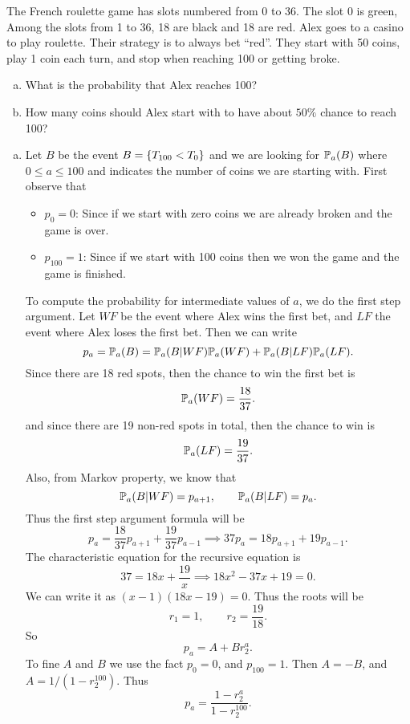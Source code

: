 \begin{problem}
	The French roulette game has slots numbered from 0 to 36. The slot 0 is green, Among the slots from 1 to 36, 18 are black and 18 are red. Alex goes to a casino to play roulette. Their strategy is to always bet ``red''. They start with 50 coins, play 1 coin each turn, and stop when reaching 100 or getting broke.
	\begin{enumerate}[(a)]
		\item What is the probability that Alex reaches 100?
		\item How many coins should Alex start with to have about $50\%$ chance to reach 100?
	\end{enumerate}
\end{problem}

\begin{solution}
	\begin{enumerate}[(a)]
		\item
			Let $B$ be the event $B = \{T_{100} < T_0\}$ and we are looking for $\mathbb{P}_a(B)$ where $0 \leq a \leq 100$ and indicates the number of coins we are starting with. First observe that
		\begin{itemize}
			\item $p_0 = 0$: Since if we start with zero coins we are already broken and the game is over.
			\item $p_{100} = 1$: Since if we start with 100 coins then we won the game and the game is finished.
		\end{itemize}
		To compute the probability for intermediate values of $a$, we do the first step argument. Let $WF$ be the event where Alex wins the first bet, and $LF$ the event where Alex loses the first bet. Then we can write
		\[ p_a = \mathbb{P}_a(B) = \mathbb{P}_a(B|WF)\mathbb{P}_a(WF) + \mathbb{P}_a(B|LF) \mathbb{P}_a(LF). \]
		Since there are 18 red spots, then the chance to win the first bet is
		\[ \mathbb{P}_a(WF) = \frac{18}{37}. \]
		and since there are 19 non-red spots in total, then the chance to win is
		\[ \mathbb{P}_a(LF)  = \frac{19}{37}.\]
		Also, from Markov property, we know that
		\[ \mathbb{P}_a(B|WF)= p_{a+1}, \qquad \mathbb{P}_a(B|LF)=p_a. \]
		Thus the first step argument formula will be
		\[  p_a = \frac{18}{37}p_{a+1} + \frac{19}{37}p_{a-1} \implies \boxed{37p_a = 18p_{a+1} + 19p_{a-1}}. \]
		The characteristic equation for the recursive equation is
		\[ 37 = 18 x + \frac{19}{x} \implies \boxed{18x^2 - 37x + 19 = 0}. \]
		We can write it as $(x-1)(18x-19) = 0$. Thus the roots will be
		\[ r_1 = 1, \qquad r_2 = \frac{19}{18}. \]
		So
		\[ p_a = A + Br_2^a. \]
		To fine $A$ and $B$ we use the fact $p_0 = 0$, and $p_{100} = 1$. Then $A = -B$, and $A = 1/(1-r_2^{100})$. Thus
		\[ \boxed{p_a = \frac{1-r_2^a}{1-r_2^{100}}}.  \]
		

\end{enumerate}
\end{solution}
